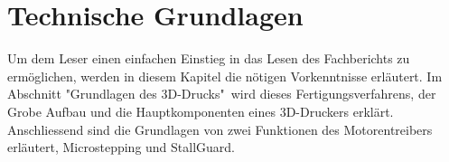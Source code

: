 \section{Technische Grundlagen}
\label{sec:TechnischeGrundlagen}
Um dem Leser einen einfachen Einstieg in das Lesen des Fachberichts zu ermöglichen, werden in diesem Kapitel die nötigen Vorkenntnisse erläutert.
Im Abschnitt "Grundlagen des 3D-Drucks"\, wird dieses Fertigungsverfahrens, der Grobe Aufbau und die  Hauptkomponenten eines 3D-Druckers erklärt. Anschliessend sind die Grundlagen von zwei Funktionen  des Motorentreibers erläutert, Microstepping und StallGuard. 
